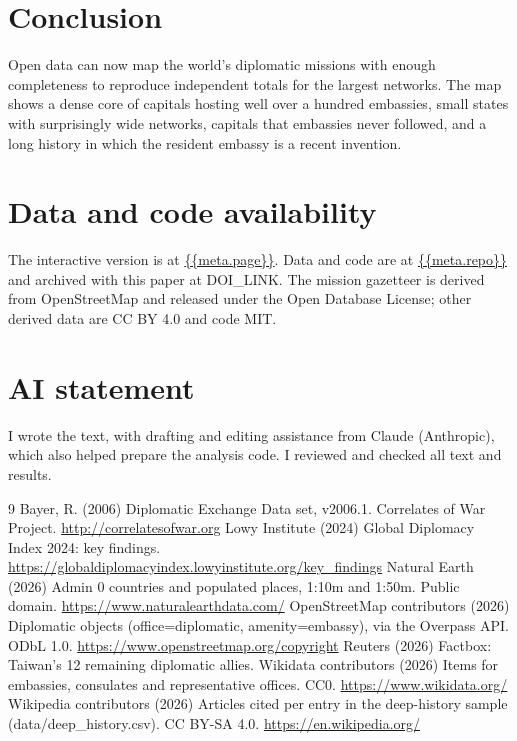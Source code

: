 \documentclass[11pt,a4paper]{article}
\begin{document}
\section{Conclusion}
Open data can now map the world's diplomatic missions with enough completeness to reproduce independent totals for the largest networks. The map shows a dense core of capitals hosting well over a hundred embassies, small states with surprisingly wide networks, capitals that embassies never followed, and a long history in which the resident embassy is a recent invention.

\section*{Data and code availability}
The interactive version is at \url{{{meta.page}}}. Data and code are at \url{{{meta.repo}}} and archived with this paper at {{DOI_LINK}}. The mission gazetteer is derived from OpenStreetMap and released under the Open Database License; other derived data are CC BY 4.0 and code MIT.

\section*{AI statement}
I wrote the text, with drafting and editing assistance from Claude (Anthropic), which also helped prepare the analysis code. I reviewed and checked all text and results.

\begin{thebibliography}{9}
 Bayer, R. (2006) Diplomatic Exchange Data set, v2006.1. Correlates of War Project. \url{http://correlatesofwar.org}
 Lowy Institute (2024) Global Diplomacy Index 2024: key findings. \url{https://globaldiplomacyindex.lowyinstitute.org/key_findings}
 Natural Earth (2026) Admin 0 countries and populated places, 1:10m and 1:50m. Public domain. \url{https://www.naturalearthdata.com/}
 OpenStreetMap contributors (2026) Diplomatic objects (office=diplomatic, amenity=embassy), via the Overpass API. ODbL 1.0. \url{https://www.openstreetmap.org/copyright}
 Reuters (2026) Factbox: Taiwan's 12 remaining diplomatic allies.
 Wikidata contributors (2026) Items for embassies, consulates and representative offices. CC0. \url{https://www.wikidata.org/}
 Wikipedia contributors (2026) Articles cited per entry in the deep-history sample (data/deep\_history.csv). CC BY-SA 4.0. \url{https://en.wikipedia.org/}
\end{thebibliography}
\end{document}
